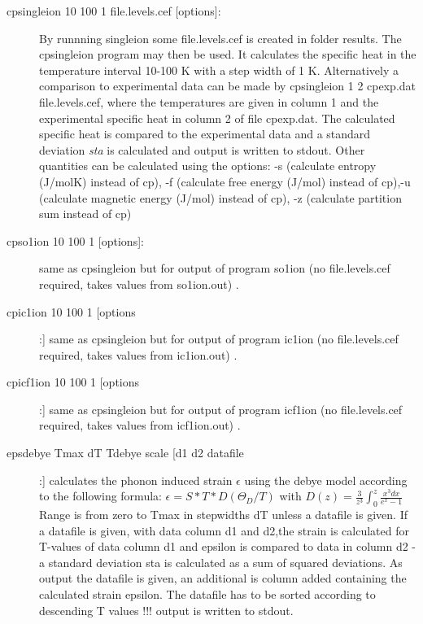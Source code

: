 \begin{description}
\item [\prg cpsingleion 10 100 1 file.levels.cef {[options]}: ] 
By runnning {\prg singleion} some file.levels.cef is created in folder results.
The {\prg cpsingleion} program may then be used. It
calculates the specific heat in the temperature 
interval 10-100 K with a step width
of 1 K. Alternatively a comparison to experimental data can be made by {\prg cpsingleion 1 2 
cpexp.dat file.levels.cef},
where the temperatures are given in column 1 and the experimental specific heat in column
2 of file cpexp.dat. The calculated specific heat is compared to the experimental data and
a standard deviation {\em sta} is calculated and output is written to stdout.
Other quantities can be calculated using the options: -s  (calculate entropy  (J/molK) instead %
of cp),
-f (calculate free energy (J/mol) instead of cp),-u  (calculate magnetic energy (J/mol) instead %
of cp),
-z (calculate partition sum instead of cp)

\item [\prg cpso1ion 10 100 1 {[options]}: ] same as {\prg cpsingleion} but for output of program
so1ion (no file.levels.cef required, takes values from so1ion.out) .
\item[\prg cpic1ion 10 100 1 [options]:] same as {\prg cpsingleion} but for output of program
ic1ion (no file.levels.cef required, takes values from ic1ion.out) .
\item[\prg cpicf1ion 10 100 1 [options]:] same as {\prg cpsingleion} but for output of program
icf1ion (no file.levels.cef required, takes values from icf1ion.out) .
					  
\item [\prg epsdebye Tmax dT Tdebye scale [d1 d2 datafile]:]	        
		    calculates the phonon induced strain $\epsilon$ using the debye model
		    according to the following formula:
		    $   \epsilon=S*T*D(\Theta_{D}/T) $
				    with    
		    $D(z)=\frac{3}{z^3}\int_0^z \frac{x^3 dx}{e^x-1}$
                 Range is from zero to Tmax in stepwidths dT
		 unless a datafile is given. 
                 If a  datafile is given, with data column d1 and d2,the strain
                 is calculated for T-values of data column d1 and epsilon
		  is compared to data in column d2 - a standard 
                 deviation sta is calculated as a sum of squared deviations.
                 As output the datafile is given, an additional is column added 
		 containing the calculated strain epsilon. The datafile has to
		 be sorted according to descending T values !!!
                 output is written to stdout.


\end{description}
